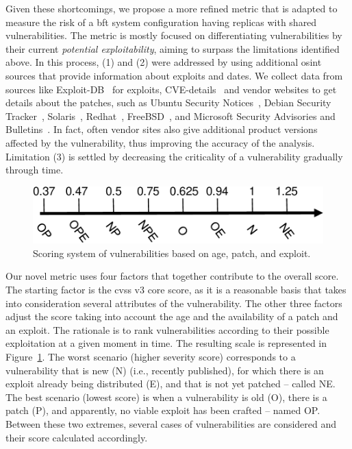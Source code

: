 Given these shortcomings, we propose a more refined metric that is adapted to measure the risk of a \gls{bft} system configuration having replicas with shared vulnerabilities.
The metric is mostly focused on differentiating vulnerabilities by their current \emph{potential exploitability}, aiming to surpass the limitations identified above.
In this process, (1) and (2) were addressed by using additional \gls{osint} sources that provide information about exploits and dates. 
We collect data from sources like Exploit-DB~\cite{edb} for exploits, CVE-details~\cite{cvedetails} and vendor websites to get details about the patches, such as Ubuntu Security Notices~\cite{ubuntu}, Debian Security Tracker~\cite{debian}, Solaris~\cite{solaris}, Redhat~\cite{redhat}, FreeBSD~\cite{freebsd}, and Microsoft Security Advisories and Bulletins~\cite{microsoft}. In fact, often vendor sites also give additional product versions affected by the vulnerability, thus improving the accuracy of the analysis. 
Limitation (3) is settled by decreasing the criticality of a vulnerability gradually through time.


\begin{figure}[t]
\begin{center}
\includegraphics[width=0.7\columnwidth]{images/images/scale.pdf}
\caption{Scoring system of vulnerabilities based on age, patch, and exploit.}
\label{fig:scale}
\end{center}
\end{figure}


Our novel metric uses four factors that together contribute to the overall score. 
The starting factor is the \gls{cvss} v3 core score, as it is a reasonable basis that takes into consideration several attributes of the vulnerability.
The other three factors adjust the score taking into account the age and the availability of a patch and an exploit. 
The rationale is to rank vulnerabilities according to their possible exploitation at a given moment in time.
The resulting scale is represented in Figure~\ref{fig:scale}.
The worst scenario (higher severity score) corresponds to a vulnerability that is new (N) (i.e., recently published), for which there is an exploit already being distributed (E), and that is not yet patched -- called NE.
The best scenario (lowest score) is when a vulnerability is old (O), there is a patch (P), and apparently, no viable exploit has been crafted -- named OP. 
Between these two extremes, several cases of vulnerabilities are considered and their score calculated accordingly.

